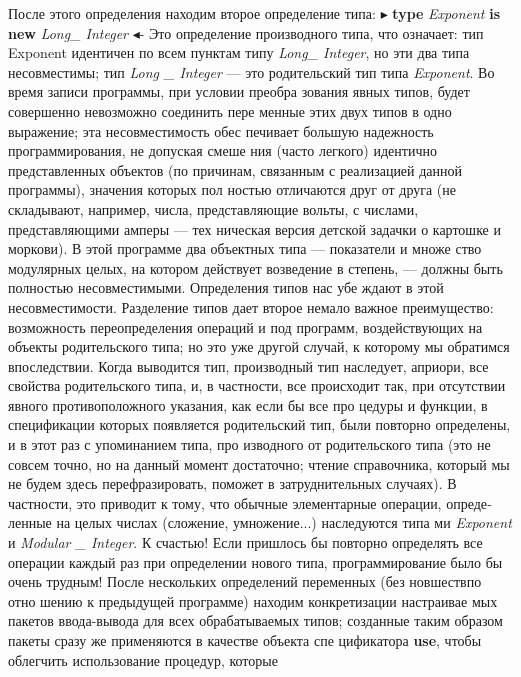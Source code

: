 После этого определения находим второе определение типа: $\blacktriangleright$ {\bf type} {\it Ex­ponent } {\bf is new} {\it Long\_ Integer} $\blacktriangleleft$- Это определение производного типа, что
означает: тип Exponent идентичен по всем пунктам типу {\it Long\_ Integer},
но эти два типа несовместимы; тип {\it Long \_ Integer} — это родительский
тип типа {\it Exponent}. Во время записи программы, при условии преобра­
зования явных типов, будет совершенно невозможно соединить пере­
менные этих двух типов в одно выражение; эта несовместимость обес­
печивает большую надежность программирования, не допуская смеше­
ния (часто легкого) идентично представленных объектов (по причинам,
связанным с реализацией данной программы), значения которых пол­
ностью отличаются друг от друга (не складывают, например, числа,
представляющие вольты, с числами, представляющими амперы — тех­
ническая версия детской задачки о картошке и моркови).
В этой программе два объектных типа — показатели и множе­
ство модулярных целых, на котором действует возведение в степень, —
должны быть полностью несовместимыми. Определения типов нас убе­
ждают в этой несовместимости. Разделение типов дает второе немало­
важное преимущество: возможность переопределения операций и под­
программ, воздействующих на объекты родительского типа; но это уже
другой случай, к которому мы обратимся впоследствии.
Когда выводится тип, производный тип наследует, априори, все
свойства родительского типа, и, в частности, все происходит так, при
отсутствии явного противоположного указания, как если бы все про­
цедуры и функции, в спецификации которых появляется родительский
тип, были повторно определены, и в этот раз с упоминанием типа, про­
изводного от родительского типа (это не совсем точно, но на данный
момент достаточно; чтение справочника, который мы не будем здесь
перефразировать, поможет в затруднительных случаях). В частности,
это приводит к тому, что обычные элементарные операции, опреде­
ленные на целых числах (сложение, умножение...) наследуются типа­
ми {\it Exponent} и {\it Modular \_ Integer}. К счастью! Если пришлось бы повторно
определять все операции каждый раз при определении нового типа,
программирование было бы очень трудным!
После нескольких определений переменных (без новшествпо отно­
шению к предыдущей программе) находим конкретизации настраивае­
мых пакетов ввода-вывода для всех обрабатываемых типов; созданные
таким образом пакеты сразу же применяются в качестве объекта спе­
цификатора {\bf use}, чтобы облегчить использование процедур, которые

\newpage

